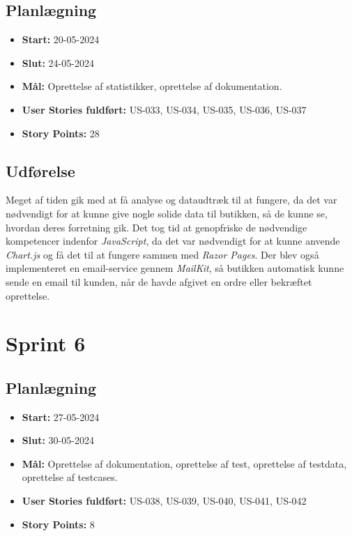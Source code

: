 \subsection{Planlægning}
\label{subsec:sprint-5-plan}
\begin{itemize}
    \item \textbf{Start:} 20-05-2024
    \item \textbf{Slut:} 24-05-2024
    \item \textbf{Mål:} Oprettelse af statistikker, oprettelse af dokumentation.
    \item \textbf{User Stories fuldført:} US-033, US-034, US-035, US-036, US-037
    \item \textbf{Story Points:} 28
\end{itemize}

\subsection{Udførelse}
\label{subsec:sprint-5-udforelse}
Meget af tiden gik med at få analyse og dataudtræk til at fungere, da det var nødvendigt for at kunne give nogle solide data til butikken, så de kunne se, hvordan deres forretning gik.
Det tog tid at genopfriske de nødvendige kompetencer indenfor \emph{JavaScript}, da det var nødvendigt for at kunne anvende \emph{Chart.js} og få det til at fungere sammen med \emph{Razor Pages}.
Der blev også implementeret en email-service gennem \emph{MailKit}, så butikken automatisk kunne sende en email til kunden, når de havde afgivet en ordre eller bekræftet oprettelse.

\section{Sprint 6}
\label{sec:sprint-6}
\subsection{Planlægning}
\label{subsec:sprint-6-plan}
\begin{itemize}
    \item \textbf{Start:} 27-05-2024
    \item \textbf{Slut:} 30-05-2024
    \item \textbf{Mål:} Oprettelse af dokumentation, oprettelse af test, oprettelse af testdata, oprettelse af testcases.
    \item \textbf{User Stories fuldført:} US-038, US-039, US-040, US-041, US-042
    \item \textbf{Story Points:} 8
\end{itemize}


